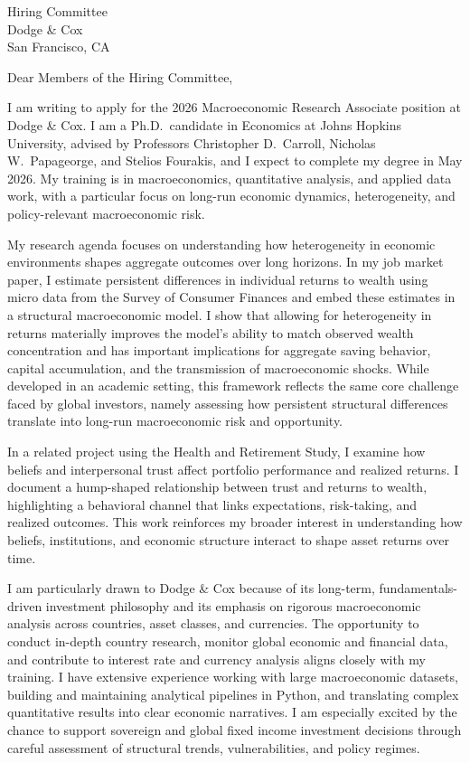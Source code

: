 \documentclass[11pt,letterpaper]{letter}
\begin{document}
\begin{letter}{
Hiring Committee \\
Dodge \& Cox \\
San Francisco, CA
}

\opening{Dear Members of the Hiring Committee,}

I am writing to apply for the 2026 Macroeconomic Research Associate position at Dodge \& Cox. I am a Ph.D.\ candidate in Economics at Johns Hopkins University, advised by Professors Christopher D.~Carroll, Nicholas W.~Papageorge, and Stelios Fourakis, and I expect to complete my degree in May 2026. My training is in macroeconomics, quantitative analysis, and applied data work, with a particular focus on long-run economic dynamics, heterogeneity, and policy-relevant macroeconomic risk.

My research agenda focuses on understanding how heterogeneity in economic environments shapes aggregate outcomes over long horizons. In my job market paper, I estimate persistent differences in individual returns to wealth using micro data from the Survey of Consumer Finances and embed these estimates in a structural macroeconomic model. I show that allowing for heterogeneity in returns materially improves the model’s ability to match observed wealth concentration and has important implications for aggregate saving behavior, capital accumulation, and the transmission of macroeconomic shocks. While developed in an academic setting, this framework reflects the same core challenge faced by global investors, namely assessing how persistent structural differences translate into long-run macroeconomic risk and opportunity.

In a related project using the Health and Retirement Study, I examine how beliefs and interpersonal trust affect portfolio performance and realized returns. I document a hump-shaped relationship between trust and returns to wealth, highlighting a behavioral channel that links expectations, risk-taking, and realized outcomes. This work reinforces my broader interest in understanding how beliefs, institutions, and economic structure interact to shape asset returns over time.

I am particularly drawn to Dodge \& Cox because of its long-term, fundamentals-driven investment philosophy and its emphasis on rigorous macroeconomic analysis across countries, asset classes, and currencies. The opportunity to conduct in-depth country research, monitor global economic and financial data, and contribute to interest rate and currency analysis aligns closely with my training. I have extensive experience working with large macroeconomic datasets, building and maintaining analytical pipelines in Python, and translating complex quantitative results into clear economic narratives. I am especially excited by the chance to support sovereign and global fixed income investment decisions through careful assessment of structural trends, vulnerabilities, and policy regimes.


\end{letter}
\end{document}
